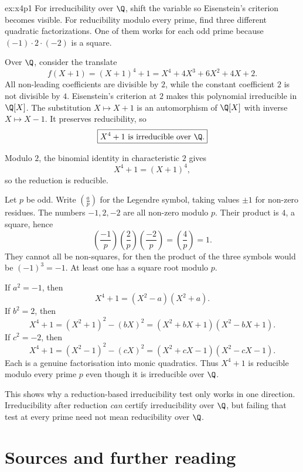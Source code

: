 \begin{solution}{ex:x4p1}
\idea For irreducibility over $\Q$, shift the variable so Eisenstein's criterion becomes visible. For reducibility modulo every prime, find three different quadratic factorizations. One of them works for each odd prime because $(-1)\cdot2\cdot(-2)$ is a square.

\writeup Over $\Q$, consider the translate
\[
f(X+1)=(X+1)^4+1=X^4+4X^3+6X^2+4X+2.
\]
All non-leading coefficients are divisible by $2$, while the constant coefficient $2$ is not divisible by $4$. Eisenstein's criterion at $2$ makes this polynomial irreducible in $\Q[X]$. The substitution $X\mapsto X+1$ is an automorphism of $\Q[X]$ with inverse $X\mapsto X-1$. It preserves reducibility, so
\[
\boxed{X^4+1\text{ is irreducible over }\Q.}
\]

Modulo $2$, the binomial identity in characteristic $2$ gives
\[
X^4+1=(X+1)^4,
\]
so the reduction is reducible.

Let $p$ be odd. Write $\left(\frac ap\right)$ for the Legendre symbol, taking values $\pm1$ for non-zero residues. The numbers $-1,2,-2$ are all non-zero modulo $p$. Their product is $4$, a square, hence
\[
\left(\frac{-1}{p}\right)\left(\frac2p\right)
\left(\frac{-2}{p}\right)=\left(\frac4p\right)=1.
\]
They cannot all be non-squares, for then the product of the three symbols would be $(-1)^3=-1$. At least one has a square root modulo $p$.

If $a^2=-1$, then
\[
X^4+1=(X^2-a)(X^2+a).
\]
If $b^2=2$, then
\[
X^4+1=(X^2+1)^2-(bX)^2
=(X^2+bX+1)(X^2-bX+1).
\]
If $c^2=-2$, then
\[
X^4+1=(X^2-1)^2-(cX)^2
=(X^2+cX-1)(X^2-cX-1).
\]
Each is a genuine factorisation into monic quadratics. Thus $X^4+1$ is reducible modulo every prime $p$ even though it is irreducible over $\Q$.

This shows why a reduction-based irreducibility test only works in one direction. Irreducibility after reduction \emph{can} certify irreducibility over $\Q$, but failing that test at every prime need not mean reducibility over $\Q$.
\end{solution}

\section*{Sources and further reading}

